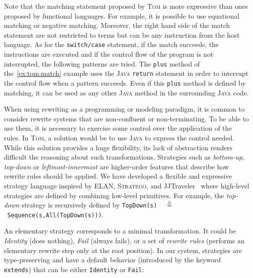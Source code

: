 \documentclass[runningheads]{llncs}
\newcommand{\stratego}{\textsc{Stratego}}
\newcommand{\jjtraveler}{{JJTraveler}}
\newcommand{\elan}    {\textsf{ELAN}\xspace}
\newcommand{\tom}{\textsc{Tom}}
\newcommand{\java}{\textsc{Java}}
\newcommand{\isdef}{\mathrel{\mbox{\small$\stackrel{\mbox{\tiny$\triangle$}}{=}$}}}
\begin{document}
Note that the matching statement proposed by {\tom} is more expressive than
ones proposed by functional languages. For example,  it is possible to use
equational matching or negative matching. Moreover, the right hand side of the
match statement are not restricted to terms but can be any instruction from the
host language. As for the \texttt{switch/case} statement, if the match
succeeds, the instructions are executed and if the control flow of the program
is not interrupted, the following patterns are tried. The \texttt{plus} method
of the~\ref{ex:tom:match} example uses the {\java} \texttt{return} statement in
order to interrupt the control flow when a pattern succeeds. Even if this
\texttt{plus} method is defined by matching, it can be used as any other
{\java} method in the surrounding {\java} code. 

When using rewriting as a programming or modeling paradigm, it is common to
consider rewrite systems that are non-confluent or non-terminating. To be able
to use them, it is necessary to exercise some control over the application of
the rules. In {\tom}, a solution would be to use {\java} to express the control
needed. While this solution provides a huge flexibility, its lack of
abstraction renders difficult the reasoning about such transformations.
Strategies such as \emph{bottom-up}, \emph{top-down} or \emph{leftmost-innermost}
are higher-order features that describe how rewrite rules should be applied.
We have developed a flexible and expressive strategy language inspired by
{\elan}, {\stratego}, and {\jjtraveler}~\cite{visser-oopsla01} where high-level
strategies are defined by combining low-level primitives. For example, the
\emph{top-down} strategy is recursively defined by
\texttt{TopDown(s)}~${\isdef}$~\texttt{Sequence(s,All(TopDown(s)))}.

An elementary strategy corresponds to a minimal transformation. It could be
\emph{Identity} (does nothing), \emph{Fail} (always fails), or a set of
\emph{rewrite rules} (performs an elementary rewrite step only at the root
position).  In our system, strategies are type-preserving and have a default
behavior (introduced by the keyword \texttt{extends}) that can be either
\texttt{Identity} or \texttt{Fail}:

\end{document}
